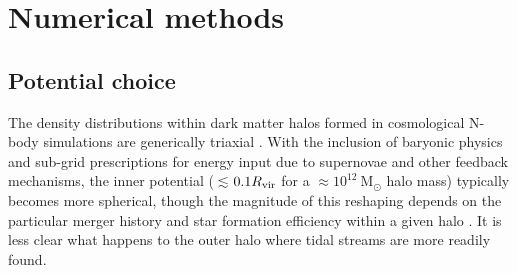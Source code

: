 \documentclass[letterpaper,12pt,preprint]{aastex}
\newcommand{\msun}{\ensuremath{\mathrm{M}_\odot}}
\begin{document}
%
%
%

\section{Numerical methods}\label{sec:methods}

\subsection{Potential choice}\label{sec:potential}

The density distributions within dark matter halos formed in cosmological N-body simulations are generically triaxial \citep[e.g.,][]{jing02, bett07, zemp09, veraciro11}. With the inclusion of baryonic physics and sub-grid prescriptions for energy input due to supernovae and other feedback mechanisms, the inner potential ($\lesssim$$0.1R_{\rm vir}$ for a $\approx$$10^{12}~\msun$ halo mass) typically becomes more spherical, though the magnitude of this reshaping depends on the particular merger history and star formation efficiency within a given halo \citep[e.g.,][]{dubinski??, recent NiHao stuff}. It is less clear what happens to the outer halo where tidal streams are more readily found. %
\end{document}
